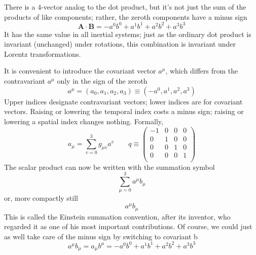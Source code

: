\documentclass[../../../main.tex]{subfiles}
\begin{document}
There is a 4-vector analog to the dot product, but it’s not just the sum of the products of like components; rather, the zeroth components have a minus sign
\begin{equation*}
\mathbf{A}\cdot\mathbf{B}=-a^0b^0+ a^1b^1+ a^2b^2+ a^3b^3
\end{equation*}
It has the same value in all inertial systems; just as the ordinary dot product is invariant (unchanged) under rotations, this combination is invariant under Lorentz transformations. 

It is convenient to introduce the covariant vector $a^\mu$, which differs from the contravariant $a^\mu$ only in the sign of the zeroth
\begin{equation*}
a^\mu= (a_0, a_1, a_2, a_3) \equiv (-a^0, a^1, a^2, a^3)
\end{equation*}
Upper indices designate contravariant vectors; lower indices are for covariant vectors. Raising or lowering the temporal index costs a minus sign; raising or lowering a spatial index changes nothing. Formally,
\begin{equation*}
    a_\mu=\sum_{v=0}^{3}g_{\mu v}a^v\qquad q\equiv
    \begin{pmatrix}
        -1&0&0&0\\
        0&1&0&0\\
        0&0&1&0\\
        0&0&0&1\\
    \end{pmatrix}
\end{equation*}
The scalar product can now be written with the summation symbol
\begin{equation*}
    \sum_{\mu=0}^{3}a^\mu b_\mu
\end{equation*}
or, more compactly still
\begin{equation*}
    a^\mu b_\mu
\end{equation*}
This is called the Einstein summation convention, after its inventor, who regarded it as one of his most important contributions. Of course, we could just as well take care of the minus sign by switching to covariant b
\begin{equation*}
    a^\mu b_\mu = a_\mu b^\mu = -a^0b^0 + a^1b^1 + a^2b^2 + a^3b^3
\end{equation*}
\end{document}
